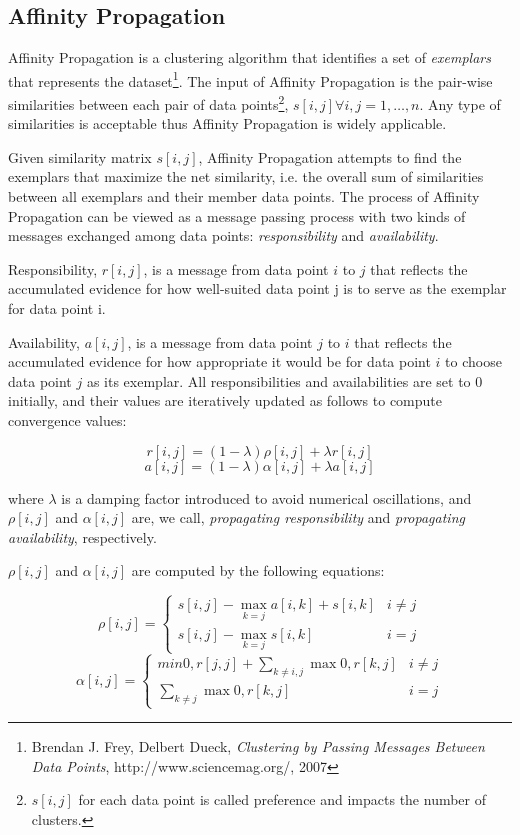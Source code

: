 \subsection{Affinity Propagation}

Affinity Propagation is a clustering algorithm that identifies a set of \textit{exemplars} that represents the dataset\footnote{Brendan J. Frey, Delbert Dueck, \emph{Clustering by Passing Messages
Between Data Points}, http://www.sciencemag.org/, 2007}. The input of Affinity Propagation is the pair-wise similarities between each pair of data points\footnote{$s[i,j]$ for each data point is called preference and impacts the number of clusters.}, $s[i, j]  \forall  i, j = 1, \ldots, n$. Any type of similarities is acceptable thus Affinity Propagation is widely applicable.

Given similarity matrix $s[i, j]$, Affinity Propagation attempts to find the exemplars that maximize the net similarity, i.e. the overall sum of similarities between all exemplars and their member data points. The process of Affinity Propagation can be viewed as a message passing process with two
kinds of messages exchanged among data points: \emph{responsibility} and \emph{availability}. 

Responsibility, $r[i, j]$, is a message from data point $i$ to $j$ that reflects the accumulated evidence for how well-suited data point j is to serve as the exemplar for data point i. 

Availability, $a[i, j]$, is a message from data point $j$ to $i$ that reflects the accumulated evidence for how appropriate it would be for data point $i$ to choose data point $j$ as
its exemplar. All responsibilities and availabilities are set to $0$ initially, and their values are iteratively updated as follows to compute convergence values:

$$r[i, j] = (1-\lambda)\rho [i, j] + \lambda r[i, j]$$
$$a[i, j] = (1 -\lambda) \alpha[i, j] + \lambda a[i, j]$$

where $\lambda$ is a damping factor introduced to avoid numerical oscillations, and $\rho[i, j]$ and $\alpha[i, j]$ are, we call, \emph{propagating responsibility} and \emph{propagating availability}, respectively. 

$\rho[i, j]$ and $\alpha[i, j]$ are computed by the following equations:

$$
\rho[i, j] =
\left\{
\begin{array}{lr}
s[i, j] − \max_{k=j}a[i, k] + s[i, k] & i \neq j\\
s[i, j] − \max_{k=j}s[i, k]  &  i= j 
\end{array}
\right.
$$
$$
\alpha[i, j] =
\left\{
\begin{array}{lr}
min{0, r[j, j] + \sum_{k \neq i, j} \max 0, r[k, j]} & i \neq j\\
\sum_{k\neq j} \max {0, r[k, j]}  &  i= j 
\end{array}
\right.
$$

